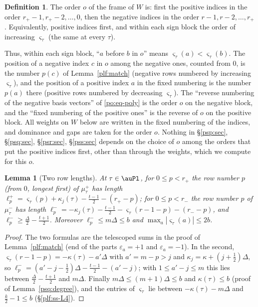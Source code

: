 \documentclass[10pt]{amsart}
\newtheorem{lemma}[theorem]{Lemma}
\theoremstyle{definition}
\newtheorem{definition}[theorem]{Definition}
\theoremstyle{remark}
\begin{document}
\begin{definition}\label{psv:order}
The order $o$ of the frame of $W$ is: first the positive indices in the order $r_+-1,r_+-2,\dots,0$,
then the negative indices in the order $r-1,r-2,\dots,r_+$. Equivalently, positive indices first,
and within each sign block the order of increasing $\varsigma_\tau$ (the same at every $\tau$).
\end{definition}

\noindent Thus, within each sign block, ``$a$ before $b$ in $o$'' means $\varsigma_\tau(a)<\varsigma_\tau(b)$.
The position of a negative index $c$ in $o$ among the negative ones, counted from $0$, is the number
$p(c)$ of Lemma~\ref{plf:match} (negative rows numbered by increasing $\varsigma_\tau$), and the
position of a positive index $a$ in the fixed numbering is the number $p(a)$ there (positive rows
numbered by decreasing $\varsigma_\tau$). The ``reverse numbering of the negative basis vectors'' of
\eqref{po:eq-poly} is the order $o$ on the negative block, and the ``fixed numbering of the positive
ones'' is the reverse of $o$ on the positive block. All weights on $W$ below are written in the fixed
numbering of the indices, and dominance and gaps are taken for the order $o$. Nothing in
\S\ref{psp:sec}, \S\ref{psq:sec}, \S\ref{psr:sec}, \S\ref{pss:sec} depends on the choice of $o$ among
the orders that put the positive indices first, other than through the weights, which we compute
for this $o$.

\begin{lemma}[Two row lengths]\label{psv:rows}
At $\tau\in\auPl$, for $0\le p<r_+$ the row number $p$ \textup(from $0$, longest first\textup) of
$\mu^+_\tau$ has length $\ell^+_p=\varsigma_\tau(p)+\kappa_j(\tau)-\frac{t-1}2-(r_+-p)$; for $0\le p<r_-$ the
row number $p$ of $\mu^-_\tau$ has length $\ell^-_p=-\kappa_j(\tau)-\frac{t-1}2-\varsigma_\tau(r-1-p)-(r_--p)$,
and $\ell^-_p\ge\frac\Delta2-\frac{t+1}2$. Moreover $\ell^-_p\le m\Delta\le b$ and $\max_a|\varsigma_\tau(a)|\le2b$.
\end{lemma}
\begin{proof}
The two formulas are the telescoped sums in the proof of Lemma~\ref{plf:match} (end of the parts
$\varepsilon_a=+1$ and $\varepsilon_a=-1$). In the second, $\varsigma_\tau(r-1-p)=-\kappa(\tau)-a'\Delta$ with
$a'=m-p>j$ and $\kappa_j=\kappa+(j+\frac12)\Delta$, so $\ell^-_p=(a'-j-\frac12)\Delta-\frac{t-1}2-(a'-j)$; with
$1\le a'-j\le m$ this lies between $\frac\Delta2-\frac{t+1}2$ and $m\Delta$. Finally $m\Delta\le(m+1)\Delta\le b$
and $\kappa(\tau)\le b$ (proof of Lemma~\ref{psq:degree}), and the entries of $\varsigma_\tau$ lie between
$-\kappa(\tau)-m\Delta$ and $\frac k2-1\le b$ (\S\ref{plf:ss-L4}).
\end{proof}
\end{document}
